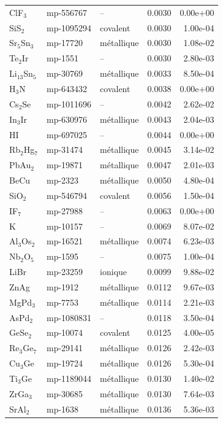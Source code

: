 \begin{longtable}{@{}l l l r r@{}}
ClF$_{3}$ & mp-556767 & -- & 0.0030 & 0.00e+00 \\
SiS$_{2}$ & mp-1095294 & covalent & 0.0030 & 1.00e-04 \\
Sr$_{5}$Sn$_{3}$ & mp-17720 & m\'etallique & 0.0030 & 1.08e-02 \\
Te$_{2}$Ir & mp-1551 & -- & 0.0030 & 2.80e-03 \\
Li$_{13}$Sn$_{5}$ & mp-30769 & m\'etallique & 0.0033 & 8.50e-04 \\
H$_{3}$N & mp-643432 & covalent & 0.0038 & 0.00e+00 \\
Cs$_{2}$Se & mp-1011696 & -- & 0.0042 & 2.62e-02 \\
In$_{3}$Ir & mp-630976 & m\'etallique & 0.0043 & 2.04e-03 \\
HI & mp-697025 & -- & 0.0044 & 0.00e+00 \\
Rb$_{2}$Hg$_{7}$ & mp-31474 & m\'etallique & 0.0045 & 3.14e-02 \\
PbAu$_{2}$ & mp-19871 & m\'etallique & 0.0047 & 2.01e-03 \\
BeCu & mp-2323 & m\'etallique & 0.0050 & 4.80e-04 \\
SiO$_{2}$ & mp-546794 & covalent & 0.0056 & 1.50e-04 \\
IF$_{7}$ & mp-27988 & -- & 0.0063 & 0.00e+00 \\
K & mp-10157 & -- & 0.0069 & 8.07e-02 \\
Al$_{3}$Os$_{2}$ & mp-16521 & m\'etallique & 0.0074 & 6.23e-03 \\
Nb$_{2}$O$_{5}$ & mp-1595 & -- & 0.0075 & 1.00e-04 \\
LiBr & mp-23259 & ionique & 0.0099 & 9.88e-02 \\
ZnAg & mp-1912 & m\'etallique & 0.0112 & 9.67e-03 \\
MgPd$_{3}$ & mp-7753 & m\'etallique & 0.0114 & 2.21e-03 \\
AsPd$_{2}$ & mp-1080831 & -- & 0.0118 & 3.50e-04 \\
GeSe$_{2}$ & mp-10074 & covalent & 0.0125 & 4.00e-05 \\
Re$_{3}$Ge$_{7}$ & mp-29141 & m\'etallique & 0.0126 & 2.42e-03 \\
Cu$_{3}$Ge & mp-19724 & m\'etallique & 0.0126 & 5.30e-04 \\
Ti$_{3}$Ge & mp-1189044 & m\'etallique & 0.0130 & 1.40e-02 \\
ZrGa$_{3}$ & mp-30685 & m\'etallique & 0.0130 & 7.64e-03 \\
SrAl$_{2}$ & mp-1638 & m\'etallique & 0.0136 & 5.36e-03 \\

\end{longtable}
